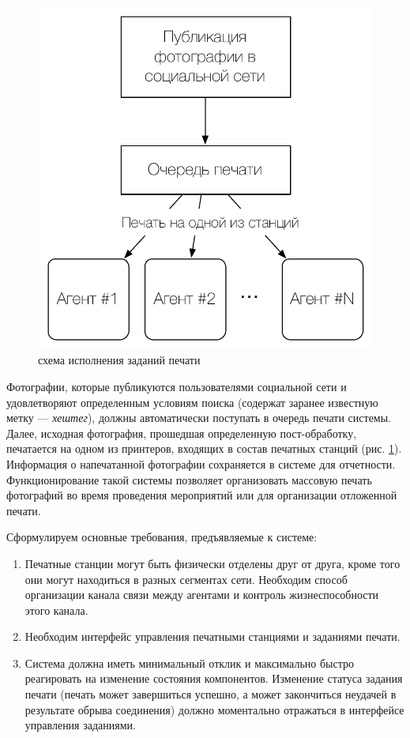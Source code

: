 \documentclass[a4paper,14pt,href,draft]{article}
\begin{document}
\begin{figure}[htbp]
\begin{center}
  \includegraphics[scale=0.7]{print-schema.pdf}
    \caption{схема исполнения заданий печати}
    \label{fig:PrintSchema}
\end{center}
\end{figure}

Фотографии, которые публикуются пользователями социальной сети и удовлетворяют определенным условиям поиска
(содержат заранее известную метку --- \textit{хештег}), должны автоматически поступать в очередь печати системы.
Далее, исходная фотография, прошедшая определенную пост-обработку, печатается на одном из принтеров, входящих в
состав печатных станций (рис. \ref{fig:PrintSchema}). Информация о напечатанной фотографии сохраняется в системе для
отчетности. Функционирование такой системы позволяет организовать массовую печать фотографий во время проведения
мероприятий или для организации отложенной печати.

Сформулируем основные требования, предъявляемые к системе:
\begin{enumerate}
  \item Печатные станции могут быть физически отделены друг от друга, кроме того они могут находиться в разных
  сегментах сети. Необходим способ организации канала связи между агентами и контроль жизнеспособности этого канала.

  \item Необходим интерфейс управления печатными станциями и заданиями печати.

  \item Система должна иметь минимальный отклик и максимально быстро реагировать на изменение состояния компонентов.
  Изменение статуса задания печати (печать может завершиться успешно, а может закончиться неудачей в результате
  обрыва соединения) должно моментально отражаться в интерфейсе управления заданиями.
\end{enumerate}
\end{document}
